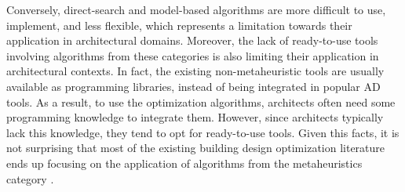 	Conversely, direct-search and model-based algorithms are more difficult to use, implement, and less flexible, which represents a limitation towards their application in architectural domains. Moreover, the lack of ready-to-use tools involving algorithms from these categories is also limiting their application in architectural contexts. In fact, the existing non-metaheuristic tools are usually available as programming libraries, instead of being integrated in popular \ac{AD} tools. As a result, to use the optimization algorithms, architects often need some programming knowledge to integrate them. However, since architects typically lack this knowledge, they tend to opt for ready-to-use tools. Given this facts, it is not surprising that most of the existing building design optimization literature ends up focusing on the application of algorithms from the metaheuristics category \cite{Evins2013,Nguyen2014,Hamdy2016}. 
	
